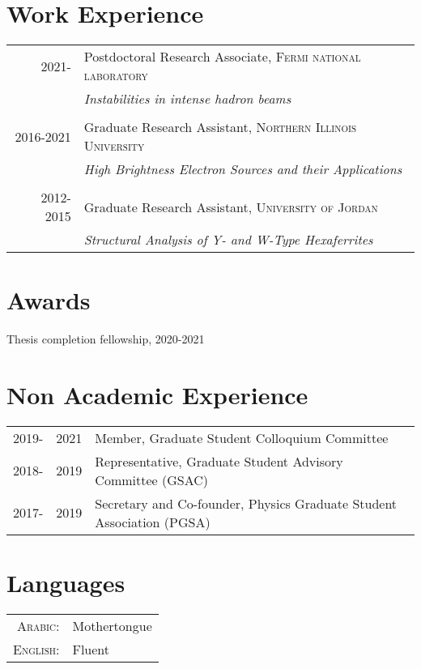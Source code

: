 \documentclass[a4paper,10pt]{article}
\begin{document}
\section{Work Experience}
\begin{tabular}{r|p{11cm}}
\textsc{2021-\hspace{0.7cm}} & Postdoctoral Research Associate,  \small \textsc{Fermi national laboratory} \\
&\emph{Instabilities in intense hadron beams }\\
\\
\textsc{2016-2021} & Graduate Research Assistant, \small \textsc{Northern Illinois University} \\
 &\emph{High Brightness Electron Sources and their Applications}\\
 \\
 \textsc{2012- 2015} & Graduate Research Assistant, \small \textsc{University of Jordan}  \\
&\emph{Structural Analysis of Y- and W-Type Hexaferrites}\\
\end{tabular}


\section{Awards}
Thesis completion fellowship, 2020-2021
\section{Non Academic Experience}
\begin{tabular}{rll}

 2019- & 2021& Member, Graduate Student Colloquium Committee \\
 2018-&2019 & Representative, Graduate Student Advisory Committee (GSAC) \\
 2017-&2019 & Secretary and Co-founder, Physics Graduate Student Association (PGSA) \\

\end{tabular}

\section{Languages}
\begin{tabular}{rl}
 \textsc{Arabic:}&Mothertongue\\
\textsc{English:}&Fluent\\
\end{tabular}
\end{document}

